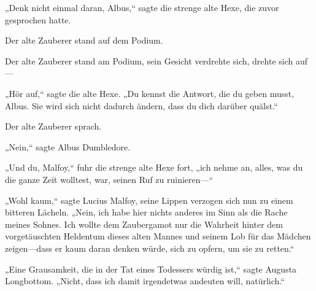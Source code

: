 „Denk nicht einmal daran, Albus,“ sagte die strenge alte Hexe, die zuvor gesprochen hatte.

Der alte Zauberer stand auf dem Podium.

Der alte Zauberer stand am Podium, sein Gesicht verdrehte sich, drehte sich auf—

„Hör auf,“ sagte die alte Hexe. „Du kennst die Antwort, die du geben musst, Albus. Sie wird sich nicht dadurch ändern, dass du dich darüber quälst.“

Der alte Zauberer sprach.

„Nein,“ sagte Albus Dumbledore.

„Und du, Malfoy,“ fuhr die strenge alte Hexe fort, „ich nehme an, alles, was du die ganze Zeit wolltest, war, seinen Ruf zu ruinieren—“

„Wohl kaum,“ sagte Lucius Malfoy, seine Lippen verzogen sich nun zu einem bitteren Lächeln.
„Nein, ich habe hier nichts anderes im Sinn als die Rache meines Sohnes. Ich wollte dem Zaubergamot nur die Wahrheit hinter dem vorgetäuschten Heldentum dieses alten Mannes und seinem Lob für das Mädchen zeigen—dass er kaum daran denken würde, sich zu opfern, um sie zu retten.“

„Eine Grausamkeit, die in der Tat eines Todessers würdig ist,“ sagte Augusta Longbottom. „Nicht, dass ich damit irgendetwas andeuten will, natürlich.“

